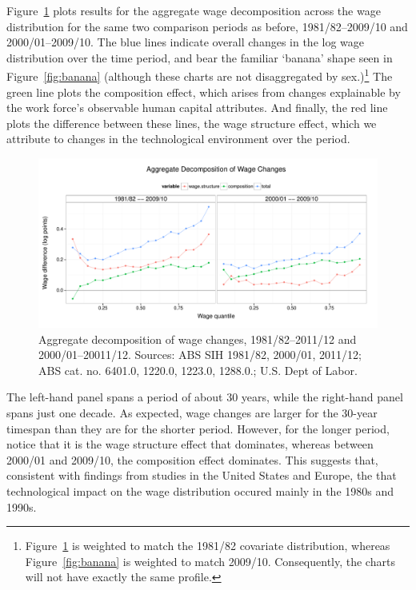 Figure~\ref{fig:aggregate} plots results for the aggregate wage decomposition across the wage distribution for the same two comparison periods as before, 1981/82--2009/10 and 2000/01--2009/10. The blue lines indicate overall changes in the log wage distribution over the time period, and bear the familiar `banana' shape seen in Figure~\ref{fig:banana} (although these charts are not disaggregated by sex.)\footnote{Figure~\ref{fig:aggregate} is weighted to match the 1981/82 covariate distribution, whereas Figure~\ref{fig:banana} is weighted to match  2009/10. Consequently, the charts will not have exactly the same profile.} The green line plots the composition effect, which arises from changes explainable by the work force's observable human capital attributes. And finally, the red line plots the difference between these lines, the wage structure effect, which we attribute to changes in the technological environment over the period.

\begin{figure}
  \centering
  \includegraphics[width=\textwidth]{../figure/aggregate_decomp.pdf}
  \caption{Aggregate decomposition of wage changes, 1981/82--2011/12 and 2000/01--20011/12. Sources: ABS SIH 1981/82, 2000/01, 2011/12; ABS cat. no. 6401.0, 1220.0, 1223.0, 1288.0.; U.S. Dept of Labor.}
  \label{fig:aggregate}
\end{figure}

The left-hand panel spans a period of about 30 years, while the right-hand panel spans just one decade. As expected, wage changes are larger for the 30-year timespan than they are for the shorter period. However, for the longer period, notice that it is the wage structure effect that dominates, whereas between 2000/01 and 2009/10, the composition effect dominates. This suggests that, consistent with findings from studies in the United States and Europe, the that technological impact on the wage distribution occured mainly in the 1980s and 1990s.

